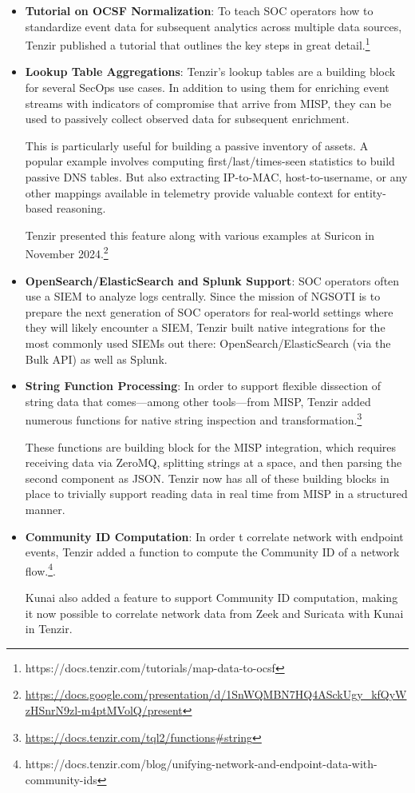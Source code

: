 \begin{itemize}
\item \textbf{Tutorial on OCSF Normalization}: To teach SOC operators how to
	standardize event data for subsequent analytics across multiple data
	sources, Tenzir published a tutorial that outlines the key steps in
	great
	detail.\footnote{https://docs.tenzir.com/tutorials/map-data-to-ocsf}

\item \textbf{Lookup Table Aggregations}: Tenzir's lookup tables are a building
	block for several SecOps use cases. In addition to using them for
	enriching event streams with indicators of compromise that arrive from
	MISP, they can be used to passively collect observed data for subsequent
	enrichment.

	This is particularly useful for building a passive inventory of assets.
	A popular example involves computing first/last/times-seen statistics to
	build passive DNS tables. But also extracting IP-to-MAC,
	host-to-username, or any other mappings available in telemetry provide
	valuable context for entity-based reasoning.

	Tenzir presented this feature along with various examples at Suricon
	in November
	2024.\footnote{\url{https://docs.google.com/presentation/d/1SnWQMBN7HQ4ASckUgy\_kfQyWzHSnrN9zl-m4ptMVolQ/present}}

\item \textbf{OpenSearch/ElasticSearch and Splunk Support}: SOC operators often
	use a SIEM to analyze logs centrally. Since the mission of NGSOTI is to
	prepare the next generation of SOC operators for real-world settings
	where they will likely encounter a SIEM, Tenzir built native
	integrations for the most commonly used SIEMs out there:
	OpenSearch/ElasticSearch (via the Bulk API) as well as Splunk.

\item \textbf{String Function Processing}: In order to support flexible
	dissection of string data that comes—among other tools—from MISP, Tenzir
	added numerous functions for native string inspection and
	transformation.\footnote{\url{https://docs.tenzir.com/tql2/functions\#string}}

	These functions are building block for the MISP integration, which
	requires receiving data via ZeroMQ, splitting strings at a space, and
	then parsing the second component as JSON. Tenzir now has all of these
	building blocks in place to trivially support reading data in real time
	from MISP in a structured manner.

\item \textbf{Community ID Computation}: In order t correlate network with
	endpoint events, Tenzir added a function to compute the Community ID of
	a network
	flow.\footnote{https://docs.tenzir.com/blog/unifying-network-and-endpoint-data-with-community-ids}.

	Kunai also added a feature to support Community ID computation, making
	it now possible to correlate network data from Zeek and Suricata with
	Kunai in Tenzir.
\end{itemize}

